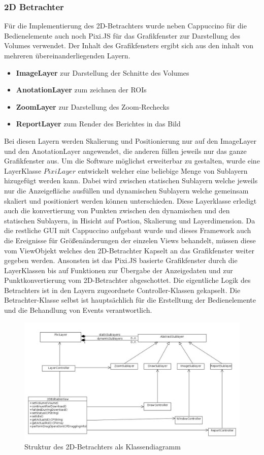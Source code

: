 \subsubsection{2D Betrachter}
\label{sec:2D Betrachter}
Für die Implementierung des 2D-Betrachters wurde neben Cappuccino für die Bedienelemente auch noch Pixi.JS für das Grafikfenster zur Darstellung des Volumes verwendet.
Der Inhalt des Grafikfensters ergibt sich aus den inhalt von mehreren übereinanderliegenden Layern.
\begin{itemize}
	\item \textbf{ImageLayer} zur Darstellung der Schnitte des Volumes
	\item \textbf{AnotationLayer} zum zeichnen der ROIs
	\item \textbf{ZoomLayer} zur Darstellung des Zoom-Rechecks
	\item \textbf{ReportLayer} zum Render des Berichtes in das Bild
\end{itemize}
Bei diesen Layern werden Skalierung und Positionierung nur auf den ImageLayer und den AnotationLayer angewendet, die anderen füllen jeweils nur das ganze Grafikfenster aus.
Um die Software möglichst erweiterbar zu gestalten,
wurde eine LayerKlasse $PixiLayer$ entwickelt welcher eine beliebige Menge von Sublayern hizugefügt werden kann.
Dabei wird zwischen statischen Sublayern welche jeweils nur die Anzeigefläche ausfüllen und dynamischen Sublayern welche gemeinsam skaliert und positioniert werden können unterschieden.
Diese Layerklasse erledigt auch die konvertierung von Punkten zwischen den dynamischen und den statischen Sublayern, in Hisicht auf Postion, Skalierung und Layerdimension.
Da die restliche GUI mit Cappuccino aufgebaut wurde und dieses Framework auch die Ereignisse für Größenänderungen der einzelen Views behandelt,
müssen diese vom ViewObjekt welches den 2D-Betrachter Kapselt an das Grafikfenster weiter gegeben werden.
Ansonsten ist das Pixi.JS basierte Grafikfenster durch die LayerKlassen bis auf Funktionen zur Übergabe der Anzeigedaten und zur Punktkonvertierung vom 2D-Betrachter abgeschottet.
Die eigentliche Logik des Betrachters ist in den Layern zugeordnete Controller-Klassen gekapselt.
Die Betrachter-Klasse selbst ist hauptsächlich für die Erstelltung der Bedienelemente und die Behandlung von Events verantwortlich.
\begin{figure}[t]
	\centering
		\includegraphics[width=\linewidth]{img/s3_2dview_class_structure.jpg}
	\caption{Struktur des 2D-Betrachters als Klassendiagramm}
	\label{fig:omip_aplication_layout}
\end{figure}

